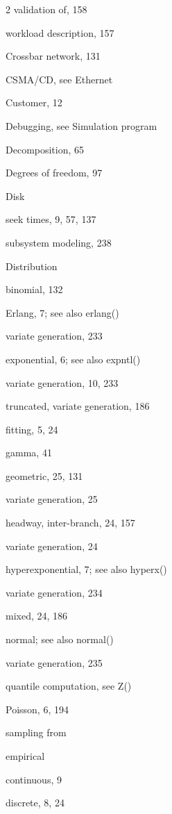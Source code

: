 \begin{multicols}{2}
\quad validation of, 158\par
\quad workload description, 157\par
\noindent Crossbar network, 131\par
\noindent CSMA/CD, see Ethernet\par
\noindent Customer, 12\par
\noindent Debugging, see Simulation program\par
\noindent Decomposition, 65\par
\noindent Degrees of freedom, 97\par
\noindent Disk\par
\quad seek times, 9, 57, 137\par
\quad subsystem modeling, 238\par
\noindent Distribution\par
\quad binomial, 132\par
\quad Erlang, 7; see also erlang()\par
\qquad variate generation, 233\par
\quad exponential, 6; see also expntl()\par
\qquad variate generation, 10, 233\par
\qquad truncated, variate generation, 186\par
\quad fitting, 5, 24\par
\quad gamma, 41\par
\quad geometric, 25, 131\par
\qquad variate generation, 25\par
\quad headway, inter-branch, 24, 157\par
\qquad variate generation, 24\par
\quad hyperexponential, 7; see also hyperx()\par
\qquad variate generation, 234\par
\quad mixed, 24, 186\par
\quad normal; see also normal()\par
\qquad variate generation, 235\par
\qquad quantile computation, see Z()\par
\quad Poisson, 6, 194\par
\quad sampling from\par
\qquad empirical\par
\qquad\quad continuous, 9\par
\qquad\quad discrete, 8, 24\par

\end{multicols}
